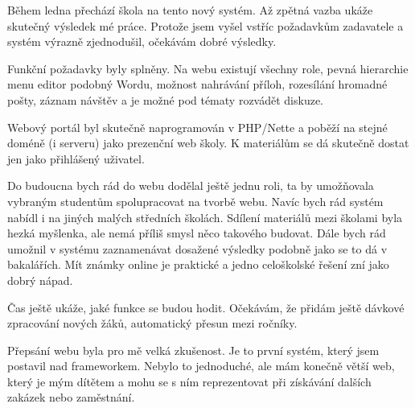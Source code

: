 \documentclass[thesis=B,czech]{FITthesis}[2012/06/26]
\begin{document}
\begin{conclusion}
Během ledna přechází škola na tento nový systém. Až zpětná vazba ukáže skutečný výsledek mé práce. Protože jsem vyšel vstříc požadavkům zadavatele a systém výrazně zjednodušil, očekávám dobré výsledky.
	
Funkční požadavky byly splněny. Na webu existují všechny role, pevná hierarchie menu editor podobný Wordu, možnost nahrávání příloh, rozesílání hromadné pošty, záznam návštěv a je možné pod tématy rozvádět diskuze.

Webový portál byl skutečně naprogramován v PHP/Nette a poběží na stejné doméně (i serveru) jako prezenční web školy. K materiálům se dá skutečně dostat jen jako přihlášený uživatel.

Do budoucna bych rád do webu dodělal ještě jednu roli, ta by umožňovala vybraným studentům spolupracovat na tvorbě webu. Navíc bych rád systém nabídl i na jiných malých středních školách. Sdílení materiálů mezi školami byla hezká myšlenka, ale nemá příliš smysl něco takového budovat. Dále bych rád umožnil v systému zaznamenávat dosažené výsledky podobně jako se to dá v bakalářích. Mít známky online je praktické a jedno celoškolské řešení zní jako dobrý nápad.

Čas ještě ukáže, jaké funkce se budou hodit. Očekávám, že přidám ještě dávkové zpracování nových žáků, automatický přesun mezi ročníky.

Přepsání webu byla pro mě velká zkušenost. Je to první systém, který jsem postavil nad  frameworkem. Nebylo to jednoduché, ale mám konečně větší web, který je mým dítětem a mohu se s ním reprezentovat při získávání dalších zakázek nebo zaměstnání. 

\end{conclusion}
\end{document}
